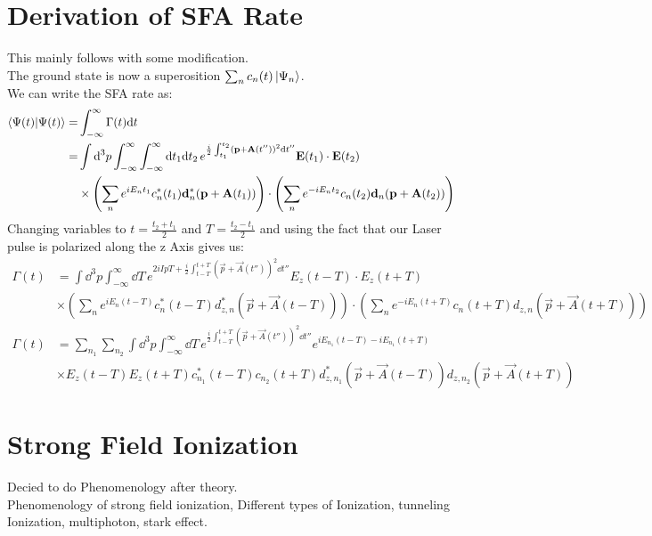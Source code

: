 \section{Derivation of SFA Rate}
This mainly follows \cite{Theory_NPS} with some modification.\\
The ground state is now a superosition $\sum_{n}c_n(t)\ket{\Psi_n}$.\\
We can write the SFA rate as:
\begin{align*}
    \braket{\Psi(t)|\Psi(t)} = &\int_{-\infty}^{\infty} \Gamma(t) \mathrm{d} t\\ 
    = &\int \mathrm{d}^3 p \int_{-\infty}^{\infty} \int_{-\infty}^{\infty} \mathrm{d} t_1  \mathrm{d} t_2 \, e^{\frac{i}{2}\int_{t_1}^{t_2}(\mathbf{p}+\mathbf{A}(t''))^2\mathrm{d} t''} \mathbf{E}(t_1)\cdot\mathbf{E}(t_2)\\
    &\times\left(\sum_{n}e^{iE_nt_1}c_n^*(t_1)\mathbf{d}_n^*(\mathbf{p}+\mathbf{A}(t_1))\right)\cdot\left(\sum_{n}e^{-iE_nt_2}c_n(t_2)\mathbf{d}_n(\mathbf{p}+\mathbf{A}(t_2))\right)
\end{align*}
Changing variables to $t=\frac{t_2+t_1}{2}$ and $T=\frac{t_2-t_1}{2}$ and using the fact that our Laser pulse is polarized along the z Axis gives us:
\begin{align*}
    \Gamma(t) &= \int \dd^3 p \int_{-\infty}^{\infty} \dd T \, e^{2iIpT+\frac{i}{2}\int_{t-T}^{t+T}(\vec{p}+\vec{A}(t''))^2\dd t''} E_z(t-T)\cdot E_z(t+T)\\
    &\times\left(\sum_{n}e^{iE_n(t-T)}c_n^*(t-T)d_{z,n}^*(\vec{p}+\vec{A}(t-T))\right)\cdot\left(\sum_{n}e^{-iE_n(t+T)}c_n(t+T)d_{z,n}(\vec{p}+\vec{A}(t+T))\right)
\end{align*}
\begin{align*}
    \Gamma(t) &= \sum_{n_1}\sum_{n_2}\int \dd^3 p \int_{-\infty}^{\infty} \dd T \, e^{\frac{i}{2}\int_{t-T}^{t+T}(\vec{p}+\vec{A}(t''))^2\dd t''} e^{iE_{n_1}(t-T)-iE_{n_1}(t+T)}\\
    &\times E_z(t-T) E_z(t+T)c_{n_1}^*(t-T)c_{n_2}(t+T) d_{z,n_1}^*(\vec{p}+\vec{A}(t-T))d_{z,n_2}(\vec{p}+\vec{A}(t+T))
\end{align*}


\newpage
\section{Strong Field Ionization}
Decied to do Phenomenology after theory.\\
Phenomenology of strong field ionization, Different types of Ionization, tunneling Ionization, multiphoton, stark effect.

